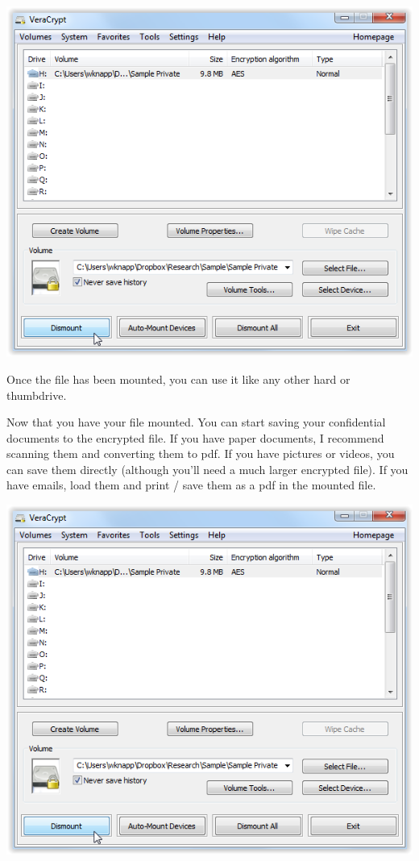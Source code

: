 \documentclass[12pt]{article}
\begin{document}
\includegraphics{imgs/VC12.PNG}

Once the file has been mounted, you can use it like any other hard or thumbdrive.

Now that you have your file mounted. You can start saving your confidential documents to
the encrypted file. If you have paper documents, I recommend scanning them and converting
them to pdf. If you have pictures or videos, you can save them directly (although you'll
need a much larger encrypted file). If you have emails, load them and print / save them as
a pdf in the mounted file.

\includegraphics{imgs/VC12.PNG}
\end{document}

